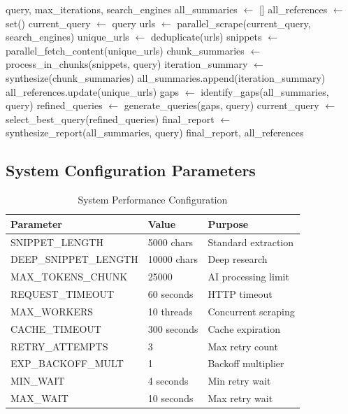 \documentclass[conference]{IEEEtran}
\begin{document}
\begin{algorithm}
\caption{Iterative Deep Research}
\begin{algorithmic}[1]
\REQUIRE query, max\_iterations, search\_engines
\STATE all\_summaries $\gets$ []
\STATE all\_references $\gets$ set()
\STATE current\_query $\gets$ query
\STATE {}
\STATE urls $\gets$ parallel\_scrape(current\_query, search\_engines)
\STATE unique\_urls $\gets$ deduplicate(urls)
\STATE {}
\STATE snippets $\gets$ parallel\_fetch\_content(unique\_urls)
\STATE {}
\STATE chunk\_summaries $\gets$ process\_in\_chunks(snippets, query)
\STATE iteration\_summary $\gets$ synthesize(chunk\_summaries)
\STATE all\_summaries.append(iteration\_summary)
\STATE all\_references.update(unique\_urls)
\STATE {}
\STATE gaps $\gets$ identify\_gaps(all\_summaries, query)
\STATE refined\_queries $\gets$ generate\_queries(gaps, query)
\STATE current\_query $\gets$ select\_best\_query(refined\_queries)
\ENDIF
\ENDFOR
\STATE {}
\STATE final\_report $\gets$ synthesize\_report(all\_summaries, query)
\RETURN final\_report, all\_references
\end{algorithmic}
\end{algorithm}

\subsection{System Configuration Parameters}

\begin{table}[htbp]
\caption{System Performance Configuration}
\label{tab:system_config}
\centering
\begin{tabular}{|l|l|l|}
\hline
\textbf{Parameter} & \textbf{Value} & \textbf{Purpose} \\
\hline
SNIPPET\_LENGTH & 5000 chars & Standard extraction \\
DEEP\_SNIPPET\_LENGTH & 10000 chars & Deep research \\
MAX\_TOKENS\_CHUNK & 25000 & AI processing limit \\
REQUEST\_TIMEOUT & 60 seconds & HTTP timeout \\
MAX\_WORKERS & 10 threads & Concurrent scraping \\
CACHE\_TIMEOUT & 300 seconds & Cache expiration \\
RETRY\_ATTEMPTS & 3 & Max retry count \\
EXP\_BACKOFF\_MULT & 1 & Backoff multiplier \\
MIN\_WAIT & 4 seconds & Min retry wait \\
MAX\_WAIT & 10 seconds & Max retry wait \\
\hline
\end{tabular}
\end{table}
\end{document}
